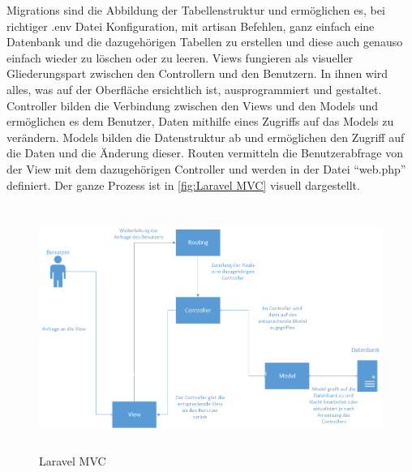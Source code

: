 Migrations sind die Abbildung der Tabellenstruktur und ermöglichen es, bei richtiger .env Datei Konfiguration, mit artisan Befehlen, ganz einfach eine Datenbank und die dazugehörigen Tabellen zu erstellen und diese auch genauso einfach wieder zu löschen oder zu leeren. Views fungieren als visueller Gliederungspart zwischen den Controllern und den Benutzern. In ihnen wird alles, was auf der Oberfläche ersichtlich ist, ausprogrammiert und gestaltet. Controller bilden die Verbindung zwischen den Views und den Models und ermöglichen es dem Benutzer, Daten mithilfe eines Zugriffs auf das Models zu verändern. Models bilden die Datenstruktur ab und ermöglichen den Zugriff auf die Daten und die Änderung dieser. Routen vermitteln die Benutzerabfrage von der View mit dem dazugehörigen Controller und werden in der Datei “web.php” definiert. Der ganze Prozess ist in \autoref{fig:Laravel MVC} visuell dargestellt. 
\begin{figure}[h]
	\centering
	\includegraphics[height=8cm,width=15cm]{images/LaravelMVC}
	\caption{Laravel MVC}
	\label{fig:Laravel MVC}
\end{figure}
\newpage




